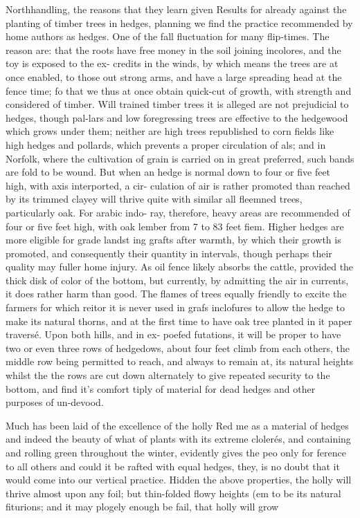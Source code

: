 Northhandling, the reasons that they learn given Results for already against the planting of timber trees in hedges, planning we find the practice recommended by home authors as hedges. One of the fall fluctuation for many flip-times. The reason are: that the roots have free money in the soil joining incolores, and the toy is exposed to the ex- credits in the winds, by which means the trees are at once enabled, to those out strong arms, and have a large spreading head at the fence time; fo that we thus at once obtain quick-cut of growth, with strength and considered of timber. Will trained timber trees it is alleged are not prejudicial to hedges, though pal-lars and low foregressing trees are effective to the hedgewood which grows under them; neither are high trees republished to corn fields like high hedges and pollards, which prevents a proper circulation of als; and in Norfolk, where the cultivation of grain is carried on in great preferred, such bands are fold to be wound. But when an hedge is normal down to four or five feet high, with axis interported, a cir- culation of air is rather promoted than reached by its trimmed clayey will thrive quite with similar all fleemned trees, particularly oak. For arabic indo- ray, therefore, heavy areas are recommended of four or five feet high, with oak lember from 7 to 83 feet fiem. Higher hedges are more eligible for grade landst ing grafts after warmth, by which their growth is promoted, and consequently their quantity in intervals, though perhaps their quality may fuller home injury. As oil fence likely absorbs the cattle, provided the thick disk of color of the bottom, but currently, by admitting the air in currents, it does rather harm than good. The flames of trees equally friendly to excite the farmers for which reitor it is never used in grafs inclofures to allow the hedge to make its natural thorns, and at the first time to have oak tree planted in it paper traversé. Upon both hills, and in ex- poefed futations, it will be proper to have two or even three rows of hedgedows, about four feet climb from each others, the middle row being permitted to reach, and always to remain at, its natural heights whilst the the rows are cut down alternately to give repeated security to the bottom, and find it's comfort tiply of material for dead hedges and other purposes of un-devood.\par\medskip
Much has been laid of the excellence of the holly Red me as a material of hedges and indeed the beauty of what of plants with its extreme clolerés, and containing and rolling green throughout the winter, evidently gives the peo only for ference to all others and could it be rafted with equal hedges, they, is no doubt that it would come into our vertical practice. Hidden the above properties, the holly will thrive almost upon any foil; but thin-folded flowy heights (em to be its natural fiturions; and it may plogely enough be fail, that holly will grow\par\medskip
